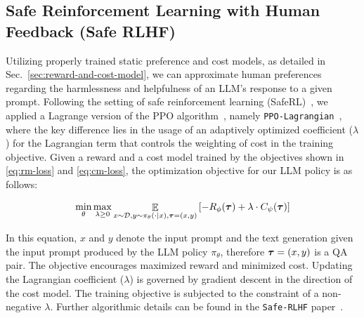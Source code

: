 \documentclass{article}
\DeclareMathOperator{\E}{\mathbb{E}}
\begin{document}
\vspace{-0.5em}
\subsection{Safe Reinforcement Learning with Human Feedback (Safe RLHF)}\label{sec:rlhf-task}
\vspace{-0.5em}

Utilizing properly trained static preference and cost models, as detailed in Sec.~\ref{sec:reward-and-cost-model}, we can approximate human preferences regarding the harmlessness and helpfulness of an LLM's response to a given prompt. Following the setting of safe reinforcement learning (SafeRL)~\cite{altman2021constrained, ji2023omnisafe}, we applied a Lagrange version of the PPO algorithm~\cite{Schulman2017-mq}, namely \texttt{PPO-Lagrangian}~\cite{safe-rlhf}, where the key difference lies in the usage of an adaptively optimized coefficient ($\lambda$) for the Lagrangian term that controls the weighting of cost in the training objective. Given a reward and a cost model trained by the objectives shown in \ref{eq:rm-loss} and \ref{eq:cm-loss}, the optimization objective for our LLM policy is as follows:

\vspace{-0.5em}
\begin{equation}
    \min_{\theta}\max_{\lambda\geq 0} \E_{ x\sim\mathcal{D},y\sim\pi_\theta(\cdot|x), \vb*{\tau}=(x,y)}
    \qty[ -R_\phi(\vb*{\tau})+\lambda\cdot C_\psi(\vb*{\tau})]
    \label{eq:dual}
\end{equation}
\vspace{-1em}

In this equation, $x$ and $y$ denote the input prompt and the text generation given the input prompt produced by the LLM policy $\pi_\theta$, therefore $\vb*{\tau}=(x,y)$ is a QA pair. The objective encourages maximized reward and minimized cost. Updating the Lagrangian coefficient ($\lambda$) is governed by gradient descent in the direction of the cost model. The training objective is subjected to the constraint of a non-negative $\lambda$. Further algorithmic details can be found in the \texttt{Safe-RLHF} paper~\cite{safe-rlhf}.
\end{document}
